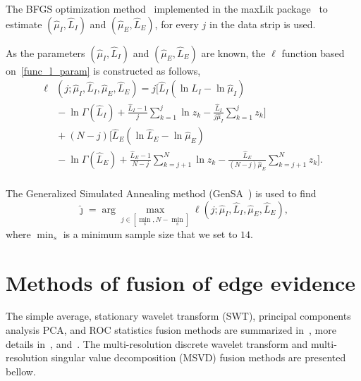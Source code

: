 \documentclass[journal]{IEEEtran}
\begin{document}
The BFGS optimization method~\cite{nw} implemented in the maxLik package~\cite{ht} to estimate $(\widehat{\mu}_I, \widehat{L}_I)$ and $(\widehat{\mu}_E, \widehat{L}_E)$, for every $j$ in the data strip is used.

As the parameters $(\widehat{\mu}_I, \widehat{L}_I)$ and $(\widehat{\mu}_E, \widehat{L}_E)$ are known, the $\ell$ function based on~\eqref{func_l_param} is constructed as follows,
\begin{equation}\label{l_com_paremetros}
 \begin{split}
\ell&(j;\widehat{\mu}_I, \widehat{L}_I,\widehat{\mu}_E, \widehat{L}_E)=j\Bigg[  \widehat{L}_I(\ln \widehat{L}_I -\ln \widehat{\mu}_I) \\
                                          &{}- \ln \Gamma(\widehat{L}_I) + \frac{\widehat{L}_I  - 1}{j} \sum_{k=1}^{j}  \ln z_k -\frac{\widehat{L}_I}{j\widehat{\mu}_I} \sum_{k=1}^{j}   z_k\Bigg] \\
                                   &{}+(N-j)\Bigg[\widehat{L}_E(\ln \widehat{L}_E - \ln \widehat{\mu}_E)\\
                                   &{}-\ln \Gamma(\widehat{L}_E) + \frac{\widehat{L}_E - 1}{N-j} \sum_{k=j+1}^{N}\ln z_k
                                   -\frac{\widehat{L}_E}{(N-j)\widehat{\mu}_E} \sum_{k=j+1}^{N}z_k\Bigg]. \\
 \end{split}
 \end{equation}
 
The Generalized Simulated Annealing method (GenSA~\cite{xgsh}) is used to find  
$$
\widehat{\jmath}= \arg\max\limits_{j\in [\min_s,N-\min_s]}\ell(j;\widehat{\mu}_I, \widehat{L}_I,\widehat{\mu}_E, \widehat{L}_E),
$$ 
where $\min_s$ is a minimum sample size that we set to $14$.

\section{Methods of fusion of edge evidence}\label{sec_04}

 The simple average, stationary wavelet transform (SWT), principal components analysis PCA, and ROC statistics fusion methods are summarized in~\cite{bmf_2019}, more details in~\cite{n_r,mit,gs}, and~\cite{fawcett}. The multi-resolution discrete wavelet transform and multi-resolution singular value decomposition (MSVD) fusion methods are presented bellow.
\end{document}
